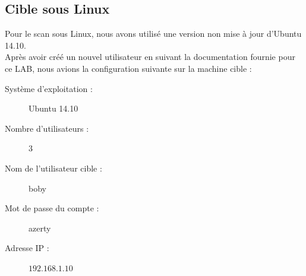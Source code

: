 \subsection{Cible sous Linux}
Pour le scan sous Linux, nous avons utilisé une version non mise à jour d'Ubuntu 14.10.\\
Après avoir créé un nouvel utilisateur en suivant la documentation fournie pour ce LAB, nous avions la configuration suivante sur la machine cible :
\begin{description}
 \item[Système d'exploitation :] Ubuntu 14.10
 \item[Nombre d'utilisateurs :] 3
 \item[Nom de l'utilisateur cible :] boby
 \item[Mot de passe du compte :] azerty
 \item[Adresse IP :] $192.168.1.10$
\end{description}